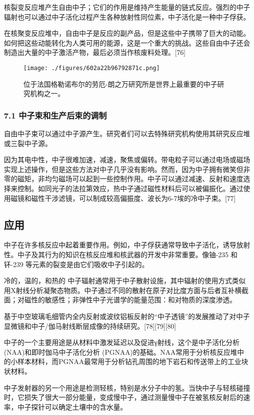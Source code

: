 核裂变反应堆产生自由中子；它们的作用是维持产生能量的链式反应。强烈的中子辐射也可以通过中子活化过程产生各种放射性同位素，中子活化是一种中子俘获。

在核聚变反应堆中，自由中子是反应的副产品，但是这些中子携带了巨大的动能。如何把这些动能转化为人类可用的能源，这是一个重大的挑战。这些自由中子还会制造出大量的中子激活产物，最后必须当作核废料处理。[76]
\begin{figure}[ht]
\centering
\texttt{[image: ./figures/602a22b96792871c.png]}
\caption{位于法国格勒诺布尔的劳厄-朗之万研究所是世界上最重要的中子研究机构之一。} \label{fig_Neutro_6}
\end{figure}

\subsubsection{7.1 中子束和生产后束的调制}
自由中子束可以通过中子源产生。研究者们可以去特殊研究机构使用其研究反应堆或三裂中子源。

因为其电中性，中子很难加速，减速，聚焦或偏转。带电粒子可以通过电场或磁场实现上述操作，但是这些方法对中子几乎没有影响。然而，因为中子拥有微笑但非零的磁矩，非均匀磁场可以起到一些控制作用。中子可以通过减速、反射和速度选择来控制。如同光子的法拉第效应，热中子通过磁性材料后可以被偏振化。通过使用磁镜和磁性干涉滤镜，可以制成较高偏振度、波长为6-7埃的冷中子束。[77]

\subsection{应用}
中子在许多核反应中起着重要作用。例如，中子俘获通常导致中子活化，诱导放射性。中子及其行为的知识在核反应堆和核武器的开发中非常重要。像铀-235 和钚-239 等元素的裂变是由它们吸收中子引起的。

冷的，温的，和热的 中子辐射通常用于中子散射设施，其中辐射的使用方式类似用X射线分析凝聚态物质。中子通过不同的散射在原子对比度方面与后者互补横截面；对磁性的敏感性；非弹性中子光谱学的能量范围：和对物质的深度渗透。

基于中空玻璃毛细管内全内反射或波纹铝板反射的“中子透镜”的发展推动了对中子显微镜和中子/伽马射线断层成像的持续研究。[78][79][80]

中子的一个主要用途是从材料中激发延迟以及促进γ射线，这个是中子活化分析 (NAA)和即时伽马中子活化分析 (PGNAA)的基础。NAA常用于分析核反应堆中的小样本材料，而PGNAA最常用于分析钻孔周围的地下岩石和传送带上的工业块状材料。

中子发射器的另一个用途是检测轻核，特别是水分子中的氢。当快中子与轻核碰撞时，它损失了很大一部分能量，变成慢中子，通过测量慢中子在被氢核反射后的速率，中子探针可以确定土壤中的含水量。

